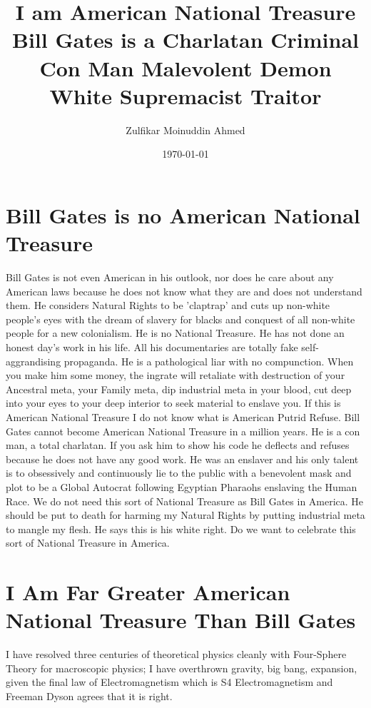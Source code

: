 \documentclass{amsart}
\title{I am American National Treasure Bill Gates is a Charlatan Criminal Con Man Malevolent Demon White Supremacist Traitor}
\author{Zulfikar Moinuddin Ahmed}
\date{\today}
\begin{document}
\maketitle

\section{Bill Gates is no American National Treasure}

Bill Gates is not even American in his outlook, nor does he care about any American laws because he does not know what they are and does not understand them.  He considers Natural Rights to be 'claptrap' and cuts up non-white people's eyes with the dream of slavery for blacks and conquest of all non-white people for a new colonialism.  He is no National Treasure.  He has not done an honest day's work in his life.  All his documentaries are totally fake self-aggrandising propaganda.  He is a pathological liar with no compunction.  When you make him some money, the ingrate will retaliate with destruction of your Ancestral meta, your Family meta, dip industrial meta in your blood, cut deep into your eyes to your deep interior to seek material to enslave you.  If this is American National Treasure I do not know what is American Putrid Refuse.  Bill Gates cannot become American National Treasure in a million years.  He is a con man, a total charlatan.  If you ask him to show his code he deflects and refuses because he does not have any good work. He was an enslaver and his only talent is to obsessively and continuously lie to the public with a benevolent mask and plot to be a Global Autocrat following Egyptian Pharaohs enslaving the Human Race.  We do not need this sort of National Treasure as Bill Gates in America.  He should be put to death for harming my Natural Rights by putting industrial meta to mangle my flesh.  He says this is his white right.  Do we want to celebrate this sort of National Treasure in America.

\section{I Am Far Greater American National Treasure Than Bill Gates}

I have resolved three centuries of theoretical physics cleanly with Four-Sphere Theory for macroscopic physics; I have overthrown gravity, big bang, expansion, given the final law of Electromagnetism which is S4 Electromagnetism and Freeman Dyson agrees that it is right. 
\end{document}
